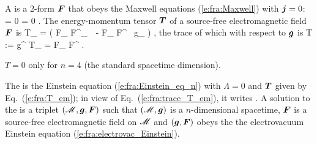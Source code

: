 A  is a 2-form $\bm{F}$
that obeys the Maxwell equations (\ref{e:fra:Maxwell}) with $\bm{j} = 0$:
\be
    \dd {} = 0 \qand  \wnab\cdot{}  = 0 .
\ee
The energy-momentum tensor $\bm{T}$ of a source-free electromagnetic field $\bm{F}$ is
\be \label{e:fra:T_em}
    T_{\alpha\beta} =  \left( F_{\mu\alpha} F^\mu_{\ \, \beta}
        -  F_{\mu\nu} F^{\mu\nu} \, g_{\alpha\beta} \right) ,
\ee
the trace of which with respect to $\bm{g}$ is
\be \label{e:fra:trace_T_em}
    T := g^{\mu\nu} T_{\mu\nu} =  F_{\mu\nu} F^{\mu\nu} .
\ee
\begin{remark}
$T = 0$ only for $n=4$ (the standard spacetime dimension).
\end{remark}
The  is the Einstein equation (\ref{e:fra:Einstein_eq_n})
with $\Lambda=0$ and $\bm{T}$ given by Eq.~(\ref{e:fra:T_em}); in view of Eq.~(\ref{e:fra:trace_T_em}), it writes
\be \label{e:fra:electrovac_Einstein}
    .
\ee
A solution to the 
is a triplet $(\mathscr{M},\bm{g},\bm{F})$ such that  $(\mathscr{M},\bm{g})$ is a $n$-dimensional spacetime,
$\bm{F}$ is a source-free electromagnetic field on $\mathscr{M}$ and $(\bm{g},\bm{F})$ obeys the
the electrovacuum Einstein equation (\ref{e:fra:electrovac_Einstein}).
